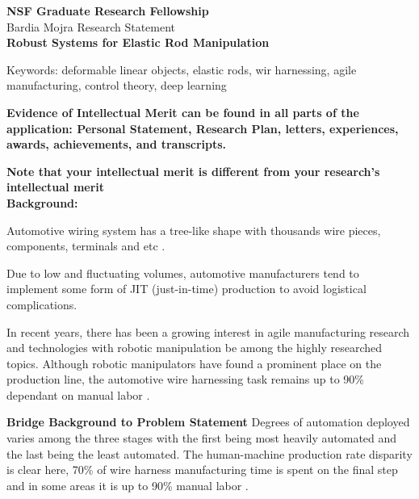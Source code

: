 \documentclass[12pt]{article}
\begin{document}
\begin{center}
\textbf{NSF Graduate Research Fellowship}\\
Bardia Mojra
\hfill
Research Statement \\
\large{\bf Robust Systems for Elastic Rod Manipulation } \\
\end{center}

\noindent
Keywords: deformable linear objects, elastic rods, wir harnessing, agile manufacturing, control theory, deep learning\\
\newline

\noindent
\textbf{Evidence of Intellectual Merit can be found in all parts of the application:
Personal Statement, Research Plan, letters, experiences, awards, achievements, and transcripts.}


\noindent
\textbf{Note that your intellectual merit is different from your research’s intellectual merit}\\


\noindent
\textbf{Background:}

Automotive wiring system has a tree-like shape with thousands wire pieces, components,
terminals and etc \cite{}.


Due to low and fluctuating volumes, automotive manufacturers tend to implement some form of JIT (just-in-time) production to avoid logistical complications.


In recent years, there has been a growing interest in agile manufacturing research and technologies with robotic manipulation be among the highly researched topics. Although robotic manipulators have found a prominent place on the production line, the automotive wire harnessing task remains up to 90\% dependant on manual labor \cite{nguyen2021manufacturing}.



\noindent
\textbf{Bridge Background to Problem Statement}
Degrees of automation deployed varies among the three stages with the first being most heavily automated and the last being the least automated. The human-machine production rate disparity is clear here, 70\% of wire harness manufacturing time is spent on the final step and in some areas it is up to 90\% manual labor \cite{nguyen2021manufacturing}.\\
\end{document}
